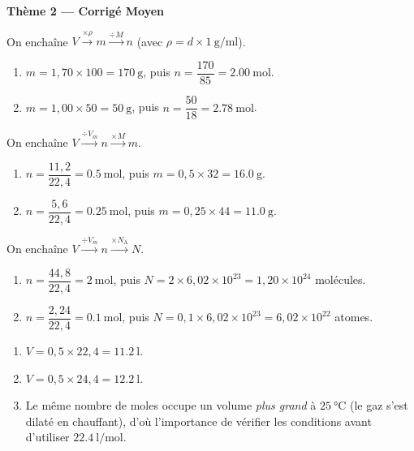 \documentclass[11pt,a4paper]{article}
\begin{document}
\begin{center}{\large\bfseries\color{primarydark} Thème 2 — Corrigé Moyen}\end{center}

\begin{corrige}
On enchaîne $V \xrightarrow{\times \rho} m \xrightarrow{\div M} n$ (avec $\rho = d\times\SI{1}{\gram\per\milli\litre}$).
\begin{enumerate}[label=\alph*)]
  \item $m = 1{,}70\times 100 = \SI{170}{\gram}$, puis $n = \dfrac{170}{85} = \SI{2.00}{\mole}$.
  \item $m = 1{,}00\times 50 = \SI{50}{\gram}$, puis $n = \dfrac{50}{18} = \SI{2.78}{\mole}$.
\end{enumerate}
\end{corrige}

\begin{corrige}
On enchaîne $V \xrightarrow{\div V_m} n \xrightarrow{\times M} m$.
\begin{enumerate}[label=\alph*)]
  \item $n = \dfrac{11{,}2}{22{,}4} = \SI{0.5}{\mole}$, puis $m = 0{,}5\times 32 = \SI{16.0}{\gram}$.
  \item $n = \dfrac{5{,}6}{22{,}4} = \SI{0.25}{\mole}$, puis $m = 0{,}25\times 44 = \SI{11.0}{\gram}$.
\end{enumerate}
\end{corrige}

\begin{corrige}
On enchaîne $V \xrightarrow{\div V_m} n \xrightarrow{\times N_{\mathrm{A}}} N$.
\begin{enumerate}[label=\alph*)]
  \item $n = \dfrac{44{,}8}{22{,}4} = \SI{2}{\mole}$, puis $N = 2\times 6{,}02\times10^{23} = 1{,}20\times10^{24}$ molécules.
  \item $n = \dfrac{2{,}24}{22{,}4} = \SI{0.1}{\mole}$, puis $N = 0{,}1\times 6{,}02\times10^{23} = 6{,}02\times10^{22}$ atomes.
\end{enumerate}
\end{corrige}

\begin{corrige}
\begin{enumerate}[label=\alph*)]
  \item $V = 0{,}5\times 22{,}4 = \SI{11.2}{\litre}$.
  \item $V = 0{,}5\times 24{,}4 = \SI{12.2}{\litre}$.
  \item Le même nombre de moles occupe un volume \emph{plus grand} à $\SI{25}{\celsius}$ (le gaz s'est
        dilaté en chauffant), d'où l'importance de vérifier les conditions avant d'utiliser
        $\SI{22.4}{\litre\per\mole}$.
\end{enumerate}
\end{corrige}
\end{document}
